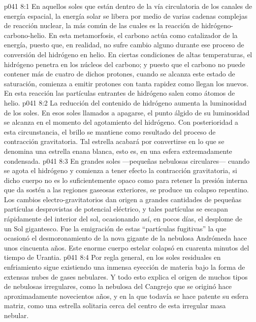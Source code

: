 \vs p041 8:1 En aquellos soles que están dentro de la vía circulatoria de los canales de energía espacial, la energía solar se libera por medio de varias cadenas complejas de reacción nuclear, la más común de las cuales es la reacción de hidrógeno\hyp{}carbono\hyp{}helio. En esta metamorfosis, el carbono actúa como catalizador de la energía, puesto que, en realidad, no sufre cambio alguno durante ese proceso de conversión del hidrógeno en helio. En ciertas condiciones de altas temperaturas, el hidrógeno penetra en los núcleos del carbono; y puesto que el carbono no puede contener más de cuatro de dichos protones, cuando se alcanza este estado de saturación, comienza a emitir protones con tanta rapidez como llegan los nuevos. En esta reacción las partículas entrantes de hidrógeno salen como átomos de helio.
\vs p041 8:2 \pc La reducción del contenido de hidrógeno aumenta la luminosidad de los soles. En esos soles llamados a apagarse, el punto álgido de su luminosidad se alcanza en el momento del agotamiento del hidrógeno. Con posterioridad a esta circunstancia, el brillo se mantiene como resultado del proceso de contracción gravitatoria. Tal estrella acabará por convertirse en lo que se denomina una estrella enana blanca, esto es, en una esfera extremadamente condensada.
\vs p041 8:3 \pc En grandes soles ---pequeñas nebulosas circulares--- cuando se agota el hidrógeno y comienza a tener efecto la contracción gravitatoria, si dicho cuerpo no es lo suficientemente opaco como para retener la presión interna que da sostén a las regiones gaseosas exteriores, se produce un colapso repentino. Los cambios electro\hyp{}gravitatorios dan origen a grandes cantidades de pequeñas partículas desprovistas de potencial eléctrico, y tales partículas se escapan rápidamente del interior del sol, ocasionando así, en pocos días, el desplome de un Sol gigantesco. Fue la emigración de estas “partículas fugitivas” la que ocasionó el desmoronamiento de la nova gigante de la nebulosa Andrómeda hace unos cincuenta años. Este enorme cuerpo estelar colapsó en cuarenta minutos del tiempo de Urantia.
\vs p041 8:4 Por regla general, en los soles residuales en enfriamiento sigue existiendo una inmensa eyección de materia bajo la forma de extensas nubes de gases nebulares. Y todo esto explica el origen de muchos tipos de nebulosas irregulares, como la nebulosa del Cangrejo que se originó hace aproximadamente novecientos años, y en la que todavía se hace patente su esfera matriz, como una estrella solitaria cerca del centro de esta irregular masa nebular.
